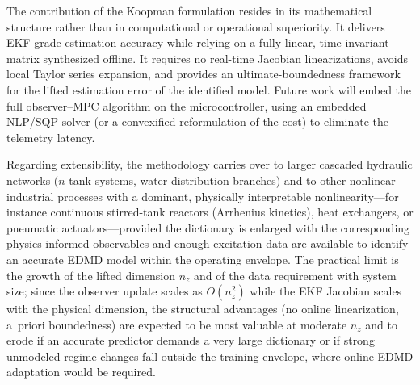 \documentclass[asi,article,accept,pdftex,moreauthors]{Definitions/mdpi}
\newcommand{\rev}[1]{#1}%
\begin{document}
{The contribution of the Koopman formulation resides in its mathematical structure rather than in computational or operational superiority. It delivers EKF-grade estimation accuracy while relying on a fully linear, time-invariant matrix synthesized offline. It requires no real-time Jacobian linearizations, avoids local Taylor series expansion, and provides an ultimate-boundedness framework for the lifted estimation error of the identified model. Future work will embed the full observer--MPC algorithm on the microcontroller, using an embedded NLP/SQP solver (or a convexified reformulation of the cost) to eliminate the telemetry latency.}

\rev{Regarding extensibility, the methodology carries over to larger cascaded hydraulic networks ($n$-tank systems, water-distribution branches) and to other nonlinear industrial processes with a dominant, physically interpretable nonlinearity---for instance continuous stirred-tank reactors (Arrhenius kinetics), heat exchangers, or pneumatic actuators---provided the dictionary is enlarged with the corresponding physics-informed observables and enough excitation data are available to identify an accurate EDMD model within the operating envelope. The practical limit is the growth of the lifted dimension $n_z$ and of the data requirement with system size; since the observer update scales as $O(n_z^2)$ while the EKF Jacobian scales with the physical dimension, the structural advantages (no online linearization, a~priori boundedness) are expected to be most valuable at moderate $n_z$ and to erode if an accurate predictor demands a very large dictionary or if strong unmodeled regime changes fall outside the training envelope, where online EDMD adaptation would be required.}
\vspace{6pt}


\end{document}
